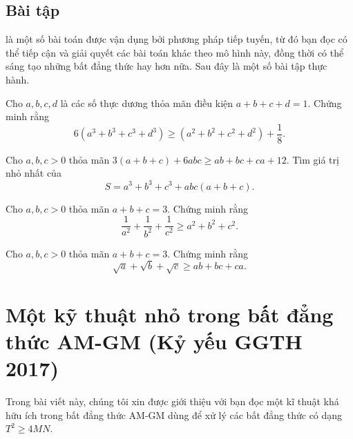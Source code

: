 {\subsection{Bài tập}
 là một số bài toán được vận dụng bởi phương pháp tiếp tuyến, từ đó bạn đọc có thể tiếp cận và giải quyết các bài toán khác theo mô hình này, đồng thời có thể sáng tạo những bất đẳng thức hay hơn nữa. Sau đây là một số bài tập thực hành.
\begin{bt}[HongKong 2002]%
	Cho $a, b, c, d$ là các số thực dương thỏa mãn điều kiện $a+b+c+d=1$. Chứng minh rằng
	\[6\left( a^3  + b^3  + c^3  + d^3  \right) \ge \left( a^2  + b^2  + c^2  + d^2  \right) + \frac{1}{8}.\]
\end{bt}
\begin{bt}%
	Cho $a, b, c>0$ thỏa mãn $3(a+b+c)+6abc \ge ab+bc+ca+12$. Tìm giá trị nhỏ nhất của \[S=a^3+b^3+c^3+abc(a+b+c).\]
\end{bt}
\begin{bt}[Romania 2005]%
	Cho $a, b, c>0$ thỏa mãn $a+b+c=3$. Chứng minh rằng \[\dfrac{1}{a^2}+\dfrac{1}{b^2}+\dfrac{1}{c^2} \ge a^2+b^2+c^2.\]
\end{bt}
\begin{bt}[Russia 2002]%
	Cho $a, b, c>0$ thỏa mãn $a+b+c=3$. Chứng minh rằng \[\sqrt{a}+\sqrt{b}+\sqrt{c} \ge ab+bc+ca.\]
\end{bt}

\section{Một kỹ thuật nhỏ trong bất đẳng thức AM-GM (Kỷ yếu
	GGTH 2017) }
\begin{center}
	\textbf{\color{violet}{Nguyễn Văn Huyện\\
			(Thành Phố Hồ Chí Minh)}}
\end{center}
Trong bài viết này, chúng tôi xin được giới thiệu với bạn đọc một kĩ thuật khá hữu ích trong bất đẳng thức AM-GM dùng để xử lý các bất đẳng thức có dạng $T^2\geq 4MN$.
}
